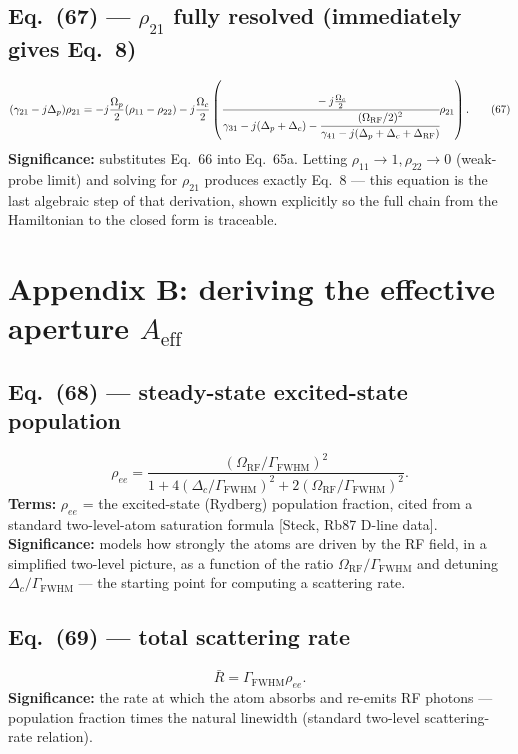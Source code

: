 \documentclass[11pt]{article}
\begin{document}
\subsection*{Eq.~(67) --- $\rho_{21}$ fully resolved (immediately gives Eq.~8)}
\begin{equation}
(\gamma_{21}-j\Delta_p)\rho_{21} = -j\frac{\Omega_p}{2}(\rho_{11}-\rho_{22})-j\frac{\Omega_c}{2}\left(\cfrac{-j\frac{\Omega_c}{2}}{\gamma_{31}-j(\Delta_p+\Delta_c)-\cfrac{(\Omega_\text{RF}/2)^2}{\gamma_{41}-j(\Delta_p+\Delta_c+\Delta_\text{RF})}}\rho_{21}\right). \tag{67}
\end{equation}
\textbf{Significance:} substitutes Eq.~66 into Eq.~65a. Letting
$\rho_{11}\to1,\rho_{22}\to0$ (weak-probe limit) and solving for
$\rho_{21}$ produces exactly Eq.~8 --- this equation is the last
algebraic step of that derivation, shown explicitly so the full chain
from the Hamiltonian to the closed form is traceable.

\section{Appendix B: deriving the effective aperture $A_\text{eff}$}

\subsection*{Eq.~(68) --- steady-state excited-state population}
\begin{equation}
\rho_{ee} = \frac{(\Omega_\text{RF}/\Gamma_\text{FWHM})^2}{1+4(\Delta_c/\Gamma_\text{FWHM})^2+2(\Omega_\text{RF}/\Gamma_\text{FWHM})^2}. \tag{68}
\end{equation}
\textbf{Terms:} $\rho_{ee}$ = the excited-state (Rydberg) population
fraction, cited from a standard two-level-atom saturation formula
[Steck, Rb87 D-line data].
\textbf{Significance:} models how strongly the atoms are driven by the
RF field, in a simplified two-level picture, as a function of the ratio
$\Omega_\text{RF}/\Gamma_\text{FWHM}$ and detuning $\Delta_c/\Gamma_\text{FWHM}$
--- the starting point for computing a scattering rate.

\subsection*{Eq.~(69) --- total scattering rate}
\begin{equation}
\bar R = \Gamma_\text{FWHM}\rho_{ee}. \tag{69}
\end{equation}
\textbf{Significance:} the rate at which the atom absorbs and
re-emits RF photons --- population fraction times the natural
linewidth (standard two-level scattering-rate relation).
\end{document}
